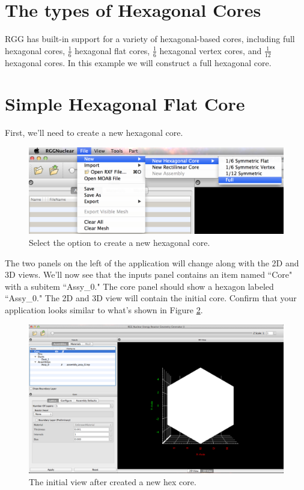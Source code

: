 \section{The types of Hexagonal Cores}

RGG has built-in support for a variety of hexagonal-based cores, including full hexagonal cores, $\frac{1}{6}$ hexagonal flat cores, $\frac{1}{6}$ hexagonal vertex cores, and $\frac{1}{12}$ hexagonal cores.  In this example we will construct a full hexagonal core.

\section{Simple Hexagonal Flat Core}

First, we'll need to create a new hexagonal core.

\begin{figure}[H]
	\begin{center}
		\includegraphics[width=0.5\linewidth]{Images/hex-new.png}
		\caption{Select the option to create a new hexagonal core.}
		\label{fig:Hex1}
	\end{center}
\end{figure}

The two panels on the left of the application will change along with the 2D and 3D views.  We'll now see that the inputs panel contains an item named ``Core" with a subitem ``Assy\_0."  The core panel should show a hexagon labeled ``Assy\_0."  The 2D and 3D view will contain the initial core. Confirm that your application looks similar to what's shown in Figure \ref{fig:Hex2}.

\begin{figure}[H]
	\begin{center}
		\includegraphics[width=0.5\linewidth]{Images/hex-new-init.png}
		\caption{The initial view after created a new hex core.}
		\label{fig:Hex2}
	\end{center}
\end{figure}

